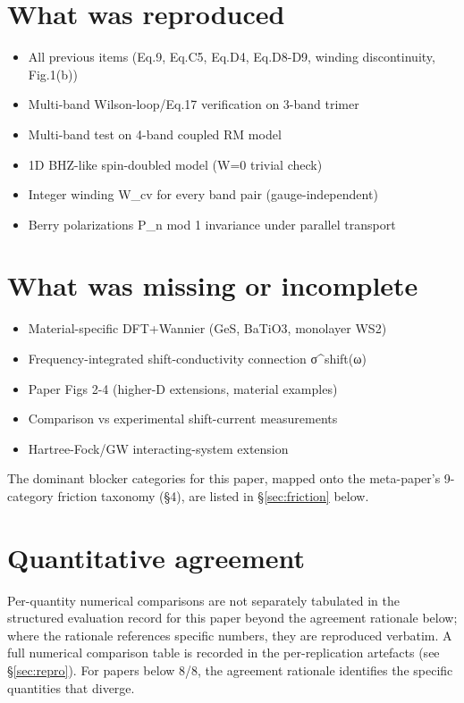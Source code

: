 \documentclass[11pt]{article}
\begin{document}
\section{What was reproduced}
\begin{itemize}
\item All previous items (Eq.9, Eq.C5, Eq.D4, Eq.D8-D9, winding discontinuity, Fig.1(b))
\item Multi-band Wilson-loop/Eq.17 verification on 3-band trimer
\item Multi-band test on 4-band coupled RM model
\item 1D BHZ-like spin-doubled model (W=0 trivial check)
\item Integer winding W\_cv for every band pair (gauge-independent)
\item Berry polarizations P\_n mod 1 invariance under parallel transport
\end{itemize}

\section{What was missing or incomplete}
\begin{itemize}
\item Material-specific DFT+Wannier (GeS, BaTiO3, monolayer WS2)
\item Frequency-integrated shift-conductivity connection σ\textasciicircum{}shift(ω)
\item Paper Figs 2-4 (higher-D extensions, material examples)
\item Comparison vs experimental shift-current measurements
\item Hartree-Fock/GW interacting-system extension
\end{itemize}
The dominant blocker categories for this paper, mapped onto the meta-paper's 9-category friction taxonomy (\S4), are listed in \S\ref{sec:friction} below.

\section{Quantitative agreement}
Per-quantity numerical comparisons are not separately tabulated in the structured evaluation record for this paper beyond the agreement rationale below; where the rationale references specific numbers, they are reproduced verbatim. A full numerical comparison table is recorded in the per-replication artefacts (see \S\ref{sec:repro}). For papers below 8/8, the agreement rationale identifies the specific quantities that diverge.
\end{document}
